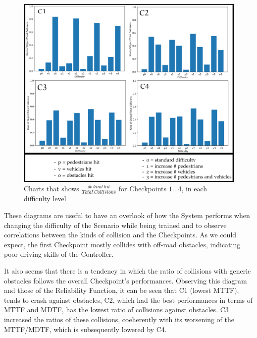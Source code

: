 \begin{figure}[h!]
	\includegraphics[width=\textwidth]{img/hit-ratios.png}
	\caption{Charts that shows $\frac{\# \: kind\: hit}{Total\: Collisions}$ for Checkpoints $1\dots 4$, in each difficulty level}
\end{figure}

These diagrams are useful to have an overlook of how the System performs when changing the difficulty of the Scenario while being trained and to observe correlations between the kinds of collision and the Checkpoints.
As we could expect, the first Checkpoint mostly collides with off-road obstacles, indicating poor driving skills of the Controller.

It also seems that there is a tendency in which the ratio of collisions with generic obstacles follows the overall Checkpoint's performances.
Observing this diagram and those of the Reliability Function, it can be seen that C1 (lowest MTTF), tends to crash against obstacles, C2, which had the best performances in terms of MTTF and MDTF, has the lowest ratio of collisions against obstacles. C3 increased the ratios of these collisions, coeherently with its worsening of the MTTF/MDTF, which is subsequently lowered by C4.\newline

